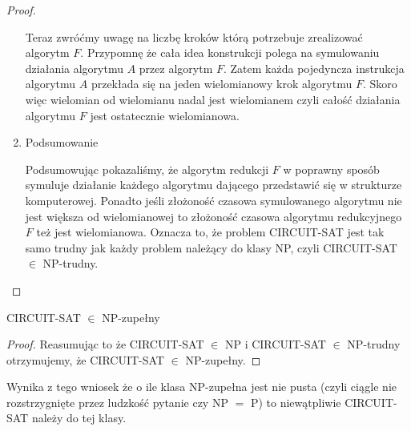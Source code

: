 \begin{proof}
\begin{enumerate}
Teraz zwróćmy uwagę na liczbę kroków którą potrzebuje zrealizować algorytm $F$. Przypomnę że cała idea konstrukcji polega na symulowaniu działania algorytmu $A$ przez algorytm $F$. Zatem każda pojedyncza instrukcja algorytmu $A$ przekłada się na jeden wielomianowy krok algorytmu $F$. Skoro więc wielomian od wielomianu nadal jest wielomianem czyli całość działania algorytmu $F$ jest ostatecznie wielomianowa.
	
\item Podsumowanie

Podsumowując pokazaliśmy, że algorytm redukcji $F$ w poprawny sposób symuluje działanie każdego algorytmu dającego przedstawić się w strukturze komputerowej. Ponadto jeśli złożoność czasowa symulowanego algorytmu nie jest większa od wielomianowej to złożoność czasowa algorytmu redukcyjnego $F$ też jest wielomianowa. Oznacza to, że problem CIRCUIT-SAT jest tak samo trudny jak każdy problem należący do klasy NP, czyli CIRCUIT-SAT $\in$ NP-trudny.


\end{enumerate}
\end{proof}

\begin{twr}
	CIRCUIT-SAT $\in$ NP-zupełny
\end{twr}

\begin{proof}
Reasumując to że CIRCUIT-SAT $\in$ NP i CIRCUIT-SAT $\in$ NP-trudny otrzymujemy, że CIRCUIT-SAT $\in$ NP-zupełny.
\end{proof}


Wynika z tego wniosek że o ile klasa NP-zupełna jest nie pusta (czyli ciągle nie rozstrzygnięte przez ludzkość pytanie czy NP $=$ P) to niewątpliwie CIRCUIT-SAT należy do tej klasy.
